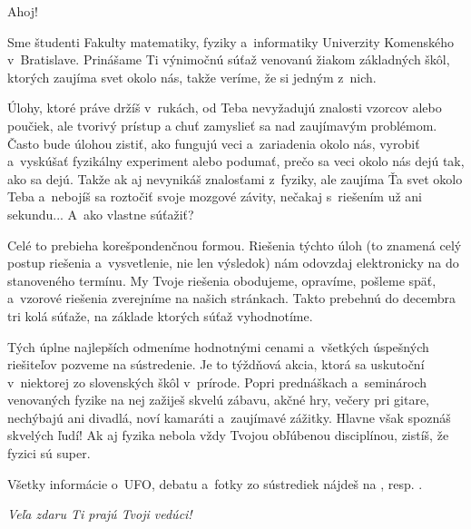 Ahoj!

Sme študenti Fakulty matematiky, fyziky a~informatiky Univerzity Komenského v~Bratislave. Prinášame Ti
výnimočnú súťaž venovanú žiakom základných škôl, ktorých zaujíma svet okolo nás, takže veríme, že si jedným
z~nich.

Úlohy, ktoré práve držíš v~rukách, od Teba nevyžadujú znalosti vzorcov alebo poučiek, ale tvorivý prístup a
chuť zamyslieť sa nad zaujímavým problémom. Často bude úlohou zistiť, ako fungujú veci a~zariadenia okolo
nás, vyrobiť a~vyskúšať fyzikálny experiment alebo podumať, prečo sa veci okolo nás dejú tak, ako sa dejú.
Takže ak aj nevynikáš znalosťami z~fyziky, ale zaujíma Ťa svet okolo Teba a~nebojíš sa roztočiť svoje mozgové
závity, nečakaj s~riešením už ani sekundu... A~ako vlastne súťažiť?

Celé to prebieha korešpondenčnou formou. Riešenia týchto úloh (to znamená celý postup riešenia a~vysvetlenie,
nie len výsledok) nám odovzdaj elektronicky na  do stanoveného termínu.
My Tvoje riešenia obodujeme, opravíme, pošleme späť, a~vzorové riešenia zverejníme na našich stránkach.
Takto prebehnú do decembra tri kolá súťaže, na základe ktorých súťaž vyhodnotíme.

Tých úplne najlepších odmeníme hodnotnými cenami a~všetkých úspešných riešiteľov pozveme na sústredenie.
Je to týždňová akcia, ktorá sa uskutoční v~niektorej zo slovenských škôl v~prírode.
Popri prednáškach a~seminároch venovaných fyzike na nej zažiješ skvelú zábavu, akčné hry, večery pri gitare,
nechýbajú ani divadlá, noví kamaráti a~zaujímavé zážitky. Hlavne však spoznáš skvelých ľudí!
Ak aj fyzika nebola vždy Tvojou obľúbenou disciplínou, zistíš, že fyzici sú super.

Všetky informácie o~UFO, debatu a~fotky zo sústrediek nájdeš na , resp. .

\hfill\textit{Veľa zdaru Ti prajú Tvoji vedúci!}
